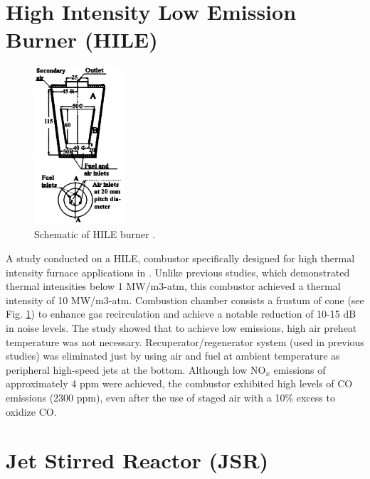 \section{High Intensity Low Emission Burner (HILE)}

\begin{figure}
\vspace{-12mm}
    \centering
    \includegraphics[width=0.3\textwidth]{Chapter2/Images/HILE.png}
  \caption[Schematic of HILE burner]{Schematic of HILE burner \cite{KUMAR20021131}.}
  \label{fig:HILE}
\end{figure}

A study conducted on a HILE, combustor specifically designed for high thermal intensity furnace applications in \cite{KUMAR20021131}. Unlike previous studies, which demonstrated thermal intensities below 1 MW/m3-atm, this combustor achieved a thermal intensity of 10 MW/m3-atm. Combustion chamber consists a frustum of cone  (see Fig. \ref{fig:HILE}) to enhance gas recirculation and achieve a notable reduction of 10-15 dB in noise levels. The study showed that to achieve low emissions, high air preheat temperature was not necessary. Recuperator/regenerator system (used in previous studies) was eliminated just by using air and fuel at ambient temperature as peripheral high-speed jets at the bottom. Although low NO$_x$ emissions of approximately 4 ppm were achieved, the combustor exhibited high levels of CO emissions (2300 ppm), even after the use of staged air with a 10$\%$ excess to oxidize CO.

\section{Jet Stirred Reactor (JSR)}

